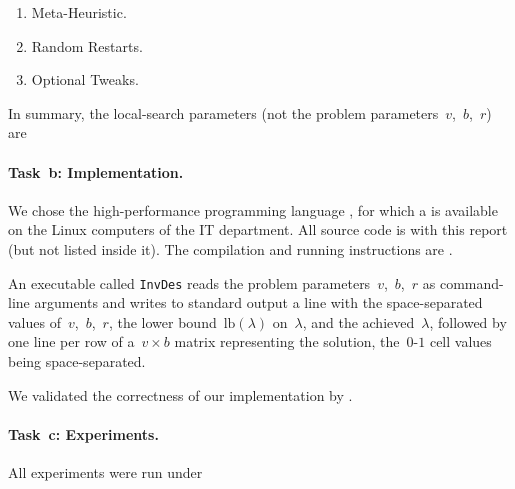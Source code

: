 \begin{enumerate}
{  value in order to terminate sometimes the search with proven
  optimality, as part of the heuristic.}
\item Meta-Heuristic.  
\item Random Restarts.  
\item Optional Tweaks.  
\end{enumerate}
In summary, the local-search parameters (not the problem
parameters~$v$,~$b$,~$r$) are~

\paragraph{Task~b: Implementation.}
We chose the high-performance programming language , for
which a  is available on the Linux
computers of the IT department.  All source code is 
with this report (but not listed inside it).  The compilation and
running instructions are \todo{\filler}.

An executable called \texttt{InvDes} reads the problem
parameters~$v$,~$b$,~$r$ as command-line arguments and writes to
standard output a line with the space-separated values
of~$v$,~$b$,~$r$, the lower bound~$\text{lb}(\lambda)$ on~$\lambda$,
and the achieved~$\lambda$, followed by one line per row of
a~$v \times b$ matrix representing the solution, the~$0$-$1$ cell
values being space-separated.

We validated the correctness of our implementation by .

\paragraph{Task~c: Experiments.}
All experiments were run under

